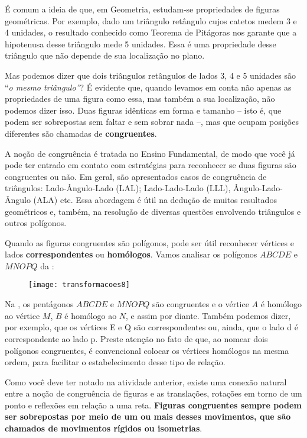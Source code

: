
É comum a ideia de que, em Geometria, estudam-se propriedades de figuras geométricas. Por exemplo, dado um triângulo retângulo cujos catetos medem 3 e 4 unidades, o resultado conhecido como Teorema de Pitágoras nos garante que a hipotenusa desse triângulo mede 5 unidades. Essa é uma propriedade desse triângulo que não depende de sua localização no plano. 

Mas podemos dizer que dois triângulos retângulos de lados 3, 4 e 5 unidades são “\textit{o mesmo triângulo”}? É evidente que, quando levamos em conta não apenas as propriedades de uma figura como essa, mas também a sua localização, não podemos dizer isso. Duas figuras idênticas em forma e tamanho – isto é, que podem ser sobrepostas sem faltar e sem sobrar nada –, mas que ocupam posições diferentes são chamadas de \textbf{congruentes}. 

A noção de congruência é tratada no Ensino Fundamental, de modo que você já pode ter entrado em contato com estratégias para reconhecer se duas figuras são congruentes ou não. Em geral, são apresentados casos de congruência de triângulos: Lado-Ângulo-Lado (LAL); Lado-Lado-Lado (LLL), Ângulo-Lado-Ângulo (ALA) etc. Essa abordagem é útil na dedução de muitos resultados geométricos e, também, na resolução de diversas questões envolvendo triângulos e outros polígonos.

Quando as figuras congruentes são polígonos, pode ser útil reconhecer vértices e lados \textbf{correspondentes} ou \textbf{homólogos}. Vamos analisar os polígonos $ABCDE$ e $MNOPQ$ da : 

\begin{figure}[H]
\centering

\texttt{[image: transformacoes8]}
\caption{}
\label{transformacoes8}
\end{figure}

Na , os pentágonos $ABCDE$ e $MNOPQ$ são congruentes e o vértice $A$ é homólogo ao vértice $M$, $B$ é homólogo ao $N$, e assim por diante.  Também podemos dizer, por exemplo, que os vértices E e Q são correspondentes ou, ainda, que o lado d é correspondente ao lado p. Preste atenção no fato de que, ao nomear dois polígonos congruentes, é  convencional colocar os vértices homólogos na mesma ordem, para facilitar o estabelecimento desse tipo de relação.  

Como você deve ter notado na atividade anterior, existe uma conexão natural entre a noção de congruência de figuras e as translações, rotações em torno de um ponto e reflexões em relação a uma reta. \textbf{Figuras congruentes sempre podem ser sobrepostas por meio de um ou mais desses movimentos, que são chamados de movimentos rígidos ou isometrias}.

